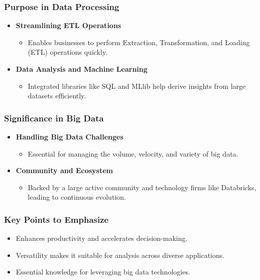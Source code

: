 \documentclass[aspectratio=169]{beamer}
\begin{document}
\begin{frame}[fragile]
  \frametitle{Purpose in Data Processing}
  \begin{itemize}
    \item \textbf{Streamlining ETL Operations}
      \begin{itemize}
        \item Enables businesses to perform Extraction, Transformation, and Loading (ETL) operations quickly.
      \end{itemize}
    
    \item \textbf{Data Analysis and Machine Learning}
      \begin{itemize}
        \item Integrated libraries like SQL and MLlib help derive insights from large datasets efficiently.
      \end{itemize}
  \end{itemize}
\end{frame}

\begin{frame}[fragile]
  \frametitle{Significance in Big Data}
  \begin{itemize}
    \item \textbf{Handling Big Data Challenges}
      \begin{itemize}
        \item Essential for managing the volume, velocity, and variety of big data.
      \end{itemize}
    
    \item \textbf{Community and Ecosystem}
      \begin{itemize}
        \item Backed by a large active community and technology firms like Databricks, leading to continuous evolution.
      \end{itemize}
  \end{itemize}
\end{frame}

\begin{frame}[fragile]
  \frametitle{Key Points to Emphasize}
  \begin{itemize}
    \item Enhances productivity and accelerates decision-making.
    \item Versatility makes it suitable for analysis across diverse applications.
    \item Essential knowledge for leveraging big data technologies.
  \end{itemize}
\end{frame}
\end{document}
